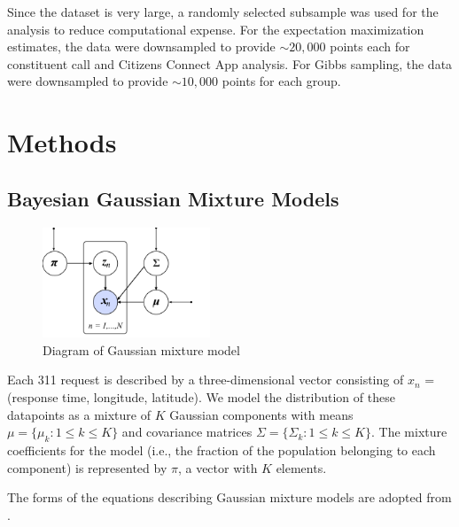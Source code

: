 \documentclass[twoside]{article}
\theoremstyle{theorem}
\theoremstyle{theorem}
\theoremstyle{theorem}
\theoremstyle{lemma}
\theoremstyle{definition}
\theoremstyle{example}
\begin{document}
Since the dataset is very large, a randomly selected subsample was used for the analysis to reduce computational expense. For the expectation maximization estimates, the data were downsampled to provide $\sim20,000$ points each for constituent call and Citizens Connect App analysis. For Gibbs sampling, the data were downsampled to provide $\sim10,000$ points for each group. 
\section{Methods}
\subsection{Bayesian Gaussian Mixture Models}
\begin{figure}
\begin{center}
\includegraphics[width=50mm]{graph_model}
\caption{Diagram of Gaussian mixture model}
\end{center}
\end{figure}
Each 311 request is described by a three-dimensional vector consisting of $x_n$ = (response time, longitude, latitude). We model the distribution of these datapoints as a mixture of $K$ Gaussian components with means $\mu = \{\mu_k :  1\leq k\leq K\}$ and covariance matrices $\Sigma = \{\Sigma_k :  1\leq k\leq K\}$. The mixture coefficients for the model (i.e., the fraction of the population belonging to each component) is represented by $\pi$, a vector with $K$ elements.  

The forms of the equations describing Gaussian mixture models are adopted from \cite{Gelman, Jones}.
\end{document}
